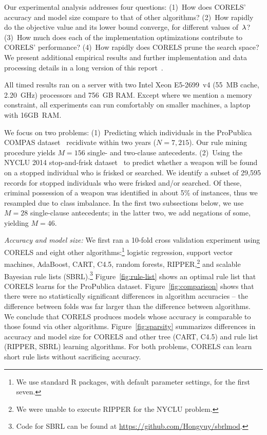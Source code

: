 
Our experimental analysis addresses four questions:
(1)~How does CORELS' accuracy and model size compare to that of other algorithms?
(2)~How rapidly do the objective value and its lower bound converge, for different values of~${\lambda}$?
(3)~How much does each of the implementation optimizations contribute to CORELS' performance?
(4)~How rapidly does CORELS prune the search space?
We present additional empirical results and further implementation and data processing details
in a long version of this report~\citep{AngelinoLaAlSeRu17}.

All timed results ran on a server with two Intel Xeon E5-2699~v4
(55~MB cache, 2.20~GHz) processors and 756~GB RAM.
%
Except where we mention a memory constraint, all experiments
can run comfortably on smaller machines, \eg a laptop with 16GB~RAM.

We focus on two problems:
(1)~Predicting which individuals in the ProPublica COMPAS dataset~\citep{LarsonMaKiAn16}
recidivate within two years (${N = 7,215}$).
Our rule mining procedure yields ${M = 156}$ single- and two-clause antecedents.
%
(2)~Using the NYCLU 2014 stop-and-frisk dataset~\citep{nyclu:2014}
to predict whether a weapon will be found on a stopped individual who is frisked or searched.
We identify a subset of 29,595 records for stopped individuals who were frisked and/or searched.
Of these, criminal possession of a weapon was identified in about 5\% of instances,
thus we resampled due to class imbalance.
In the first two subsections below, we use ${M =28}$ single-clause antecedents;
in the latter two, we add negations of some, yielding ${M =46}$.

\textit{Accuracy and model size:}
We first ran a 10-fold cross validation experiment using CORELS
and eight other algorithms:\footnote{We use standard R packages, with default
parameter settings, for the first seven.}
logistic regression, support vector machines, AdaBoost, CART, C4.5, random forests,
RIPPER,\footnote{We were unable to execute RIPPER for the NYCLU problem.}
and scalable Bayesian rule lists (SBRL).\footnote{Code for SBRL can be found at
\url{https://github.com/Hongyuy/sbrlmod}.}
%
Figure~\ref{fig:rule-list} shows an  optimal rule list that CORELS learns
for the ProPublica dataset.
%
Figure~\ref{fig:comparison} shows that there were no statistically significant
differences in algorithm accuracies --
the difference between folds was far larger than the difference between algorithms.
%
We conclude that CORELS produces models whose accuracy is comparable to those found via other algorithms.
%
Figure~\ref{fig:sparsity} summarizes differences in accuracy and model size
for CORELS and other tree (CART, C4.5) and rule list (RIPPER, SBRL) learning algorithms.
%
For both problems, CORELS can learn short rule lists without sacrificing accuracy.

